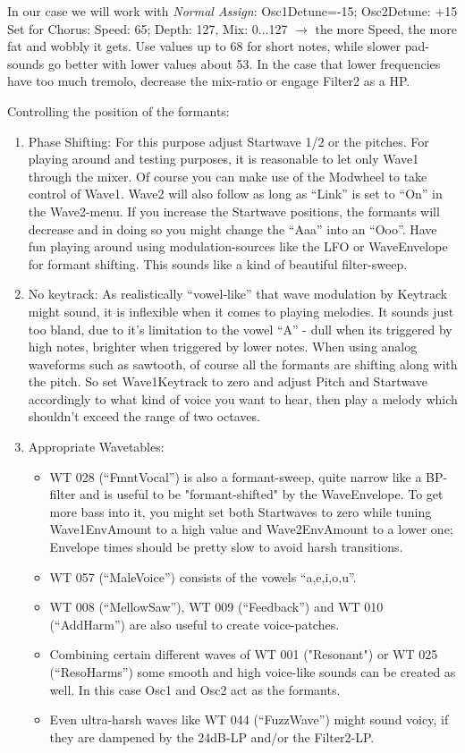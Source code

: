 \begin{enumerate}
	In our case we will work with \emph{Normal Assign}: Osc1Detune=-15; Osc2Detune: +15\\
	Set for Chorus: Speed: 65; Depth: 127, Mix: 0...127 $\to$ the more Speed, the more fat and wobbly it gets. Use values up to 68 for short notes, while slower pad-sounds go better with lower values about 53. In the case that lower frequencies have too much tremolo, decrease the mix-ratio or engage Filter2 as a HP.
\end{enumerate}
Controlling the position of the formants:
\begin{enumerate}
	\item Phase Shifting: For this purpose adjust Startwave 1/2 or the pitches. For playing around and testing purposes, it is reasonable to let only Wave1 through the mixer. Of course you can make use of the Modwheel to take control of Wave1. Wave2 will also follow as long as ``Link'' is set to ``On'' in the Wave2-menu. If you increase the Startwave positions, the formants will decrease and in doing so you might change the ``Aaa'' into an ``Ooo''. Have fun playing around using modulation-sources like the LFO or WaveEnvelope for formant shifting. This sounds like a kind of beautiful filter-sweep.
	\item No keytrack: As realistically ``vowel-like'' that wave modulation by Keytrack might sound, it is inflexible when it comes to playing melodies. It sounds just too bland, due to it's limitation to the vowel ``A'' - dull when its triggered by high notes, brighter when triggered by lower notes. When using analog waveforms such as sawtooth, of course all the formants are shifting along with the pitch. So set Wave1Keytrack to zero and adjust Pitch and Startwave accordingly to what kind of voice you want to hear, then play a melody which shouldn't exceed the range of two octaves.
	\item Appropriate Wavetables: 
	\begin{itemize}
		\item WT 028 (``FmntVocal'') is also a formant-sweep, quite narrow like a BP-filter and is useful to be "formant-shifted" by the WaveEnvelope. To get more bass into it, you might set both Startwaves to zero while tuning Wave1EnvAmount to a high value and Wave2EnvAmount to a lower one; Envelope times should be pretty slow to avoid harsh transitions.
		\item WT 057 (``MaleVoice'') consists of the vowels ``a,e,i,o,u''.
		\item WT 008 (``MellowSaw''), WT 009 (``Feedback'') and WT 010 (``AddHarm'') are also useful to create voice-patches.
		\item Combining certain different waves of WT 001 ("Resonant") or WT 025 (``ResoHarms'') some smooth and high voice-like sounds can be created as well. In this case Osc1 and Osc2 act as the formants.
		\item Even ultra-harsh waves like WT 044 (``FuzzWave'') might sound voicy, if they are dampened by the 24dB-LP and/or the Filter2-LP. 
	\end{itemize}
\end{enumerate}

